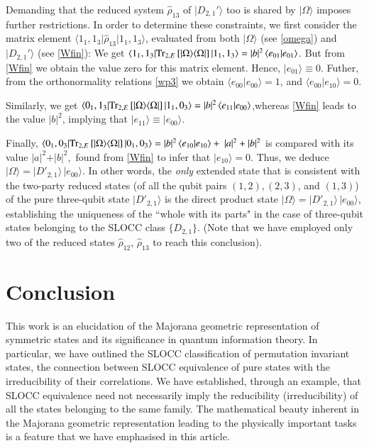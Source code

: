 Demanding that the reduced system $\hat{\rho}_{13}$ of $\vert D_{2,1}'\rangle$  too is shared by $\vert \Omega\rangle$ imposes further restrictions. In order to determine these constraints, we first consider the matrix element $\langle 1_1,1_3\vert\hat{\rho}_{13}\vert 1_1,1_3\rangle$, evaluated from both $\vert\Omega\rangle$ (see \eqref{omega}) and $\vert D_{2,1}'\rangle$  (see \eqref{Wfin}): We get $\langle 1_1,1_3\vert{\rm Tr}_{2,E}\, [\vert\Omega\rangle\langle\Omega\vert]\,\break \vert 1_1, 1_3\rangle=\vert b\vert ^2\, \langle e_{01}\vert e_{01}\rangle$. But  from \eqref{Wfin} we obtain  the value zero for this matrix element. Hence, $\vert e_{01}\rangle\equiv 0$. Futher, from the orthonormality relations \eqref{wp3} we obtain $\langle e_{00}\vert e_{00}\rangle=1$, and $\langle e_{00}\vert e_{10}\rangle=0$. 

Similarly, we get $\langle 0_1,1_3\vert{\rm Tr}_{2,E}\, [\vert\Omega\rangle\langle\Omega\vert]\, \vert 1_1,0_3\rangle=\vert b\vert^2\, \langle e_{11}\vert e_{00}\rangle$,\break  whereas  \eqref{Wfin} leads to the value $\vert b\vert^2$, implying that $\vert e_{11}\rangle\equiv \vert e_{00}\rangle$. 
 
Finally, $\langle 0_1,0_3\vert{\rm Tr}_{2,E}\, [\vert\Omega\rangle\langle\Omega\vert]\, \vert 0_1,0_3\rangle=\vert b\vert^2\, \langle e_{10}\vert e_{10}\rangle+ \ \vert a\vert^2 +\vert b\vert^2$ is  compared with its value $\vert a\vert^2+\vert b\vert^2,$  found  from \eqref{Wfin} to infer that  $\vert e_{10}\rangle=0$. Thus, we deduce $\vert\Omega\rangle=\vert D'_{2,1}\rangle\, \vert e_{00}\rangle$. In other words, the {\em only} extended state  that is consistent with the two-party reduced states (of all the qubit pairs $(1,2), (2,3)$, and $(1,3)$)  of the pure three-qubit state $\vert D'_{2,1}\rangle$ is the direct product state $\vert\Omega\rangle=\vert D'_{2,1}\rangle\, \vert e_{00}\rangle$,  establishing  the uniqueness of the ``whole with its parts" in the case of three-qubit states belonging to the SLOCC class $\{D_{2,1}\}$. (Note that we have employed only two  of the reduced states $\hat{\rho}_{12}$, $\hat{\rho}_{13}$ to reach this conclusion).

\section{Conclusion}

This work is an elucidation of the Majorana geometric representation of symmetric states and its significance in quantum information theory. In particular, we have outlined the SLOCC classification of permutation invariant states, the connection between SLOCC equivalence of pure states with the irreducibility \cite{SP1,SP2,SP2b} of their correlations. We have established, through an example, that SLOCC equivalence need not necessarily imply the reducibility (irreducibility) of all the states belonging to the same family. The  mathematical beauty inherent in the Majorana geometric representation leading to the physically important tasks is a feature that we have emphasised in this article. 


